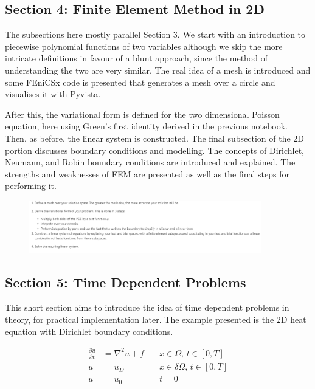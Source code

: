 \subsection{Section 4: Finite Element Method in 2D}

The subsections here mostly parallel Section 3. We start with an introduction to piecewise polynomial functions of two variables although we skip the more intricate definitions in favour of a blunt approach, since the method of understanding the two are very similar. The real idea of a mesh is introduced and some FEniCSx code is presented that generates a mesh over a circle and visualises it with Pyvista.

After this, the variational form is defined for the two dimensional Poisson equation, here using Green's first identity derived in the previous notebook. Then, as before, the linear system is constructed. The final subsection of the 2D portion discusses boundary conditions and modelling. The concepts of Dirichlet, Neumann, and Robin boundary conditions are introduced and explained. The strengths and weaknesses of FEM are presented as well as the final steps for performing it.

\begin{figure}[h]
\centering
\includegraphics[width=0.9\textwidth, frame]{./images/notebook2/5}
\end{figure}

\subsection{Section 5: Time Dependent Problems}

This short section aims to introduce the idea of time dependent problems in theory, for practical implementation later. The example presented is the 2D heat equation with Dirichlet boundary conditions.

\begin{align*}
\frac{\partial u}{\partial t} &= \nabla^2u + f \quad& x\in\Omega, \, t\in [0,T] \\
u &= u_D \quad& x \in \delta\Omega, \, t\in [0,T] \\
u &= u_0 \quad& t=0
\end{align*}

